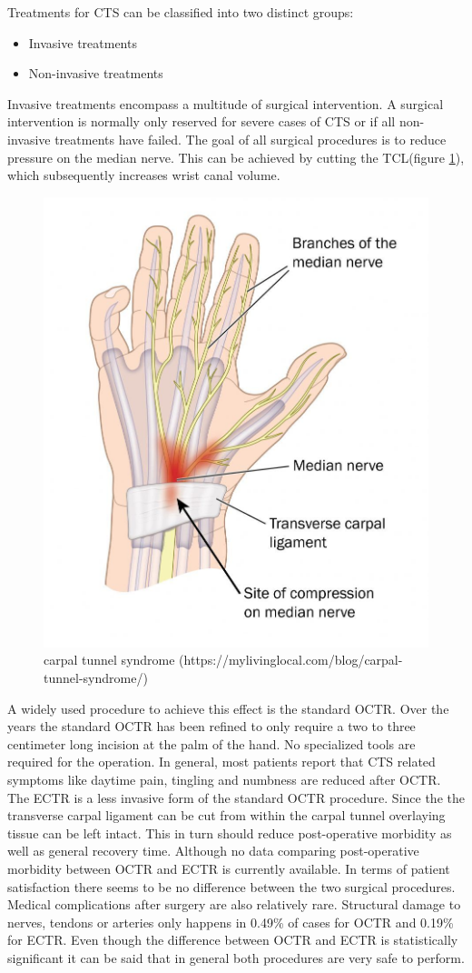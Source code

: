 Treatments for \gls{CTS} can be classified into two distinct groups:
\begin{itemize}
	\item Invasive treatments
	\item Non-invasive treatments
\end{itemize}
Invasive treatments encompass a multitude of surgical intervention.
A surgical intervention is normally only reserved for severe cases of \gls{CTS} or if all non-invasive treatments have failed\cite{scholten2007surgical}.
The goal of all surgical procedures is to reduce pressure on the median nerve.
This can be achieved by cutting the \gls{TCL}(figure \ref{fig:carpal-tunnel-syndrome}), which subsequently increases wrist canal volume.
\begin{figure}
	\centering
	\includegraphics[width=0.6\linewidth]{figures/carpal-tunnel-syndrome}
	\caption{carpal tunnel syndrome (https://mylivinglocal.com/blog/carpal-tunnel-syndrome/)}
	\label{fig:carpal-tunnel-syndrome}
\end{figure}
A widely used procedure to achieve this effect is the standard \gls{OCTR}.
Over the years the standard \gls{OCTR} has been refined to only require a two to three centimeter long incision at the palm of the hand\cite{scholten2007surgical}.
No specialized tools are required for the operation.
In general, most patients report that \gls{CTS} related symptoms like daytime pain, tingling and numbness are reduced after \gls{OCTR}\cite{louie2013outcomes}.
The \gls{ECTR} is a less invasive form of the standard \gls{OCTR} procedure.
Since the the transverse carpal ligament can be cut from within the carpal tunnel overlaying tissue can be left intact.
This in turn should reduce post-operative morbidity\cite{scholten2007surgical} as well as general recovery time.
Although no data comparing post-operative morbidity between \gls{OCTR} and \gls{ECTR} is currently available.
In terms of patient satisfaction there seems to be no difference between the two surgical procedures\cite{atroshi2015extended}.
Medical complications after surgery are also relatively rare.
Structural damage to nerves, tendons or arteries only happens in 0.49\% of cases for \gls{OCTR} and 0.19\% for \gls{ECTR}\cite{benson2006complications}.
Even though the difference between \gls{OCTR} and \gls{ECTR} is statistically significant it can be said that in general both procedures are very safe to perform.

